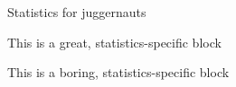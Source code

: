 

Statistics for juggernauts

This is a great, statistics-specific block

This is a boring, statistics-specific block
